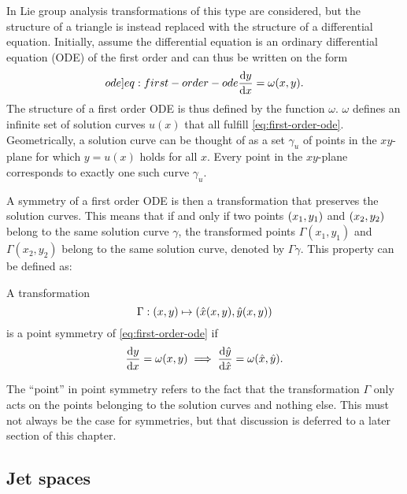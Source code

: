 In Lie group analysis transformations of this type are considered, but the structure of a triangle is instead replaced with the structure of a differential equation.
Initially, assume the differential equation is an ordinary differential equation (ODE) of the first order and can thus be written on the form
\begin{equation} \label[ode]{eq:first-order-ode}
  \dv{y}{x} = \omega(x,y).
\end{equation}
The structure of a first order ODE is thus defined by the function \(\omega\).
\(\omega\) defines an infinite set of solution curves \(u(x)\) that all fulfill \cref{eq:first-order-ode}.
Geometrically, a solution curve can be thought of as a set \(\gamma_u\) of points in the \(xy\)-plane for which \(y = u(x)\) holds for all \(x\).
Every point in the \(xy\)-plane corresponds to exactly one such curve \(\gamma_u\).

A symmetry of a first order ODE  is then a transformation that preserves the solution curves.
This means that if and only if two points \(\pqty{x_1,y_1}\) and \(\pqty{x_2,y_2}\) belong to the same solution curve \(\gamma\), the transformed points \(\Gamma(x_1,y_1)\) and \(\Gamma(x_2,y_2)\) belong to the same solution curve, denoted by \(\Gamma\gamma\).
This property can be defined as:
\begin{defn} \label{defn:first-order-symmetry}
  A transformation 
  \begin{equation}
    \Gamma: \pqty{x,y} \mapsto \pqty{\hat{x}(x,y), \hat{y}(x,y)}
  \end{equation}
  is a point symmetry of \cref{eq:first-order-ode} if
  \begin{equation}
    \dv{y}{x} = \omega(x,y)
    \implies
    \dv{\hat{y}}{\hat{x}} = \omega(\hat{x},\hat{y}).
  \end{equation}
\end{defn}
The \enquote{point} in point symmetry refers to the fact that the transformation \(\Gamma\) only acts on the points belonging to the solution curves and nothing else.
This must not always be the case for symmetries, but that discussion is deferred to a later section of this chapter. %

\subsection{Jet spaces} \label{sec:jet-spaces}

